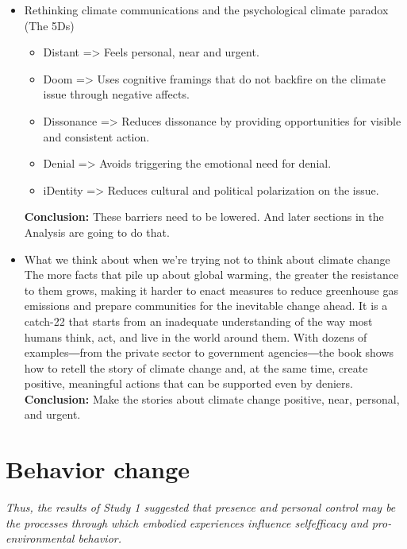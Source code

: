 \begin{itemize}
            \item Rethinking climate communications and the psychological climate paradox (The 5Ds)
                \begin{itemize}
                    \item Distant => Feels personal, near and urgent.
                    \item Doom => Uses cognitive framings that do not backfire on the climate issue through negative affects.
                    \item Dissonance => Reduces dissonance by providing opportunities for visible and consistent action.
                    \item Denial => Avoids triggering the emotional need for denial.
                    \item iDentity => Reduces cultural and political polarization on the issue.
                \end{itemize}
                \textbf{Conclusion: } These barriers need to be lowered. And later sections in the Analysis are going to do that.
            \cite{the5Ds}
            
            \item What we think about when we're trying not to think about climate change
            The more facts that pile up about global warming, the greater the resistance to them grows, making it harder to enact measures to reduce greenhouse gas emissions and prepare communities for the inevitable change ahead. It is a catch-22 that starts from an inadequate understanding of the way most humans think, act, and live in the world around them. With dozens of examples―from the private sector to government agencies―the book shows how to retell the story of climate change and, at the same time, create positive, meaningful actions that can be supported even by deniers.\cite{storyAboutClimateChange}
            \textbf{Conclusion: } Make the stories about climate change positive, near, personal, and urgent.
    \end{itemize}

    

\section{Behavior change}
\textit{Thus, the results of Study 1 suggested that presence and personal
control may be the processes through which embodied experiences influence selfefficacy and pro-environmental behavior.}

